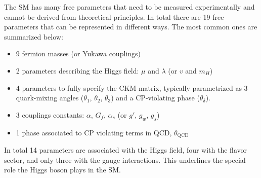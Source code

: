 The SM has many free parameters that need to be measured experimentally and cannot be derived from theoretical principles.
In total there are 19 free parameters that can be represented in different ways. The most common ones are summarized below:
\begin{itemize}
  \item 9 fermion masses (or Yukawa couplings)
  \item 2 parameters describing the Higgs field: $\mu$ and $\lambda$ (or $v$ and $m_H$)
  \item 4 parameters to fully specify the CKM matrix, typically parametrized as 3 quark-mixing angles ($\theta_1$, $\theta_2$, $\theta_3$) and a CP-violating phase ($\theta_\delta$).
  \item 3 couplings constants: $\alpha$, $G_f$, $\alpha_s$ (or $g'$, $g_w$, $g_s$)
  \item 1 phase associated to CP violating terms in QCD, $\theta_{\text{QCD}}$
\end{itemize}
In total 14 parameters are associated with the Higgs field, four with the flavor sector, and only three with the gauge interactions. This underlines the special role the Higgs boson plays in the SM.


